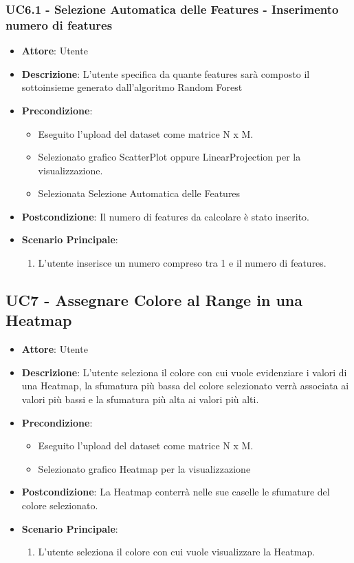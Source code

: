     \subsubsection{UC6.1 - Selezione Automatica delle Features - Inserimento numero di features}
    \label{uc6.1}
    \begin{itemize}
    \item \textbf{Attore}: Utente
    \item \textbf{Descrizione}: L'utente specifica da quante features sarà composto il sottoinsieme generato dall'algoritmo Random Forest  
    \item \textbf{Precondizione}: 
    \begin{itemize}
        \item Eseguito l'upload del dataset come matrice N x M.
        \item Selezionato grafico ScatterPlot oppure LinearProjection per la visualizzazione.
        \item Selezionata Selezione Automatica delle Features
    \end{itemize}  
    \item \textbf{Postcondizione}: Il numero di features da calcolare è stato inserito.
    \item \textbf{Scenario Principale}: 
    \begin{enumerate}
        \item L'utente inserisce un numero compreso tra 1 e il numero di features.
    \end{enumerate}  
    \end{itemize}
  
    
        \subsection{UC7 - Assegnare Colore al Range in una Heatmap}
    \begin{itemize}
    \item \textbf{Attore}: Utente
    \item \textbf{Descrizione}: L'utente seleziona il colore con cui vuole evidenziare i valori di una Heatmap, la sfumatura più bassa del colore selezionato verrà associata ai valori più bassi e la sfumatura più alta ai valori più alti.
    \item \textbf{Precondizione}: 
    \begin{itemize}
        \item Eseguito l'upload del dataset come matrice N x M.
        \item Selezionato grafico Heatmap per la visualizzazione
    \end{itemize}  
    \item \textbf{Postcondizione}: La Heatmap conterrà nelle sue caselle le sfumature del colore selezionato.
    \item \textbf{Scenario Principale}: 
    \begin{enumerate}
        \item L'utente seleziona il colore con cui vuole visualizzare la Heatmap.
    \end{enumerate}  
    \end{itemize}
    
